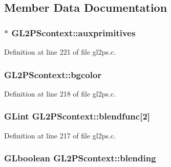 \subsection{Member Data Documentation}
\hypertarget{struct_g_l2_p_scontext_ad8b4d68371a2a6e96aa6adda339888ea}{}
\subsubsection[{auxprimitives}]{ $\ast$ G\+L2\+P\+Scontext\+::auxprimitives}\label{struct_g_l2_p_scontext_ad8b4d68371a2a6e96aa6adda339888ea}


Definition at line 221 of file gl2ps.\+c.

\hypertarget{struct_g_l2_p_scontext_aa6157739472bbe4ff311070e41f2b4a5}{}
\subsubsection[{bgcolor}]{ G\+L2\+P\+Scontext\+::bgcolor}\label{struct_g_l2_p_scontext_aa6157739472bbe4ff311070e41f2b4a5}


Definition at line 218 of file gl2ps.\+c.

\hypertarget{struct_g_l2_p_scontext_a625c3e3279762dd14978fe4991fee094}{}
\subsubsection[{blendfunc}]{\setlength{\rightskip}{0pt plus 5cm}G\+Lint G\+L2\+P\+Scontext\+::blendfunc\mbox{[}2\mbox{]}}\label{struct_g_l2_p_scontext_a625c3e3279762dd14978fe4991fee094}


Definition at line 217 of file gl2ps.\+c.

\hypertarget{struct_g_l2_p_scontext_a660b3542fd585b70fa2080739e7422ca}{}
\subsubsection[{blending}]{\setlength{\rightskip}{0pt plus 5cm}G\+Lboolean G\+L2\+P\+Scontext\+::blending}\label{struct_g_l2_p_scontext_a660b3542fd585b70fa2080739e7422ca}


